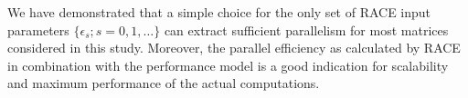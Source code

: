 We have demonstrated that a simple choice for the only set of RACE input
parameters $\{\epsilon_s; s=0,1,\ldots\}$ can extract sufficient parallelism for
most matrices considered in this study. Moreover, the parallel efficiency as
calculated by RACE in combination with the \roofline performance model is a good
indication for scalability and maximum performance of the actual computations.

